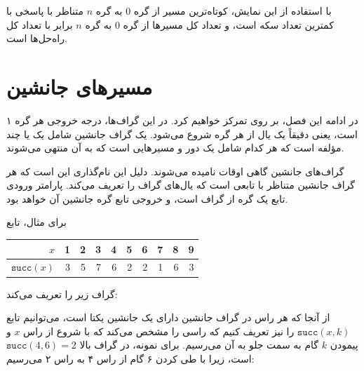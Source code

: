 با استفاده از این نمایش،
کوتاه‌ترین مسیر از گره 0 به گره $n$
متناظر با پاسخی با کمترین تعداد سکه است،
و تعداد کل مسیرها از گره 0 به گره $n$
برابر با تعداد کل راه‌حل‌ها است.

\section{مسیرهای جانشین}


در ادامه این فصل،
بر روی  تمرکز خواهیم کرد.
در این گراف‌ها،
درجه خروجی هر گره ۱ است، یعنی
دقیقاً یک یال از هر گره شروع می‌شود.
یک گراف جانشین شامل یک یا چند
مؤلفه است که هر کدام شامل
یک دور و مسیرهایی است که به آن منتهی می‌شوند.

گراف‌های جانشین گاهی اوقات
 نامیده می‌شوند.
دلیل این نام‌گذاری این است که هر گراف جانشین
متناظر با تابعی است که
یال‌های گراف را تعریف می‌کند.
پارامتر ورودی تابع یک گره از گراف است،
و خروجی تابع گره جانشین آن خواهد بود.

برای مثال، تابع
\begin{center}
\begin{tabular}{r|rrrrrrrrr}
$x$ & 1 & 2 & 3 & 4 & 5 & 6 & 7 & 8 & 9 \\
\hline
$\texttt{succ}(x)$ & 3 & 5 & 7 & 6 & 2 & 2 & 1 & 6 & 3 \\
\end{tabular}
\end{center}
گراف زیر را تعریف می‌کند:
\begin{center}
\end{center}

از آنجا که هر راس در گراف جانشین دارای یک جانشین یکتا است، می‌توانیم تابع $\texttt{succ}(x,k)$ را نیز تعریف کنیم که راسی را مشخص می‌کند که با شروع از راس $x$ و پیمودن $k$ گام به سمت جلو به آن می‌رسیم.
برای نمونه، در گراف بالا $\texttt{succ}(4,6)=2$ است، زیرا با طی کردن ۶ گام از راس ۴ به راس ۲ می‌رسیم:


